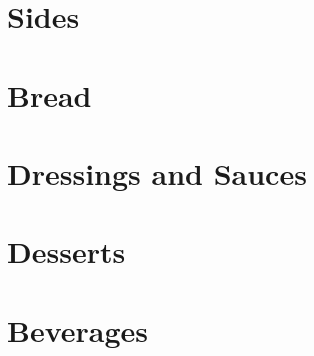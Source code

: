 \documentclass[%
letter,
11pt
]{article}
\begin{document}
\section{Sides}











\section{Bread}















\section{Dressings and Sauces}





\section{Desserts}














\section{Beverages}





\end{document}
